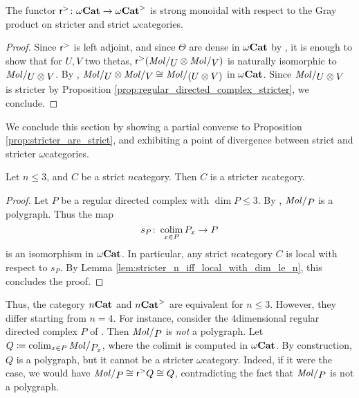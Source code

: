 \begin{prop} \label{prop:reflection_to_stricter_monoidal}
    The functor \( \mathsf{r}^{>} \colon {\omega\mathbf{Cat}} \to {\omega\mathbf{Cat}}^> \) is strong monoidal with respect to the Gray product on stricter and strict \( \omega \)\nbd categories.
\end{prop}
\begin{proof}
    Since \( \mathsf{r}^{>} \) is left adjoint, and since \( \Theta \) are dense in \( {\omega\mathbf{Cat}} \) by \cite[Proposition 4.6]{ara2020joint}, it is enough to show that for \( U, V \) two thetas, \( \rcs (\molecin{U} \gray \molecin{V}) \) is naturally isomorphic to \( \molecin{U \gray V} \).
    By \cite[Lemma 9.1.16, Proposition 11.2.36]{hadzihasanovic2024combinatorics}, \( \molecin{U} \gray \molecin{V} \cong \molecin{(U \gray V)} \) in \( {\omega\mathbf{Cat}} \).
    Since \( \molecin{U \gray V} \) is stricter by Proposition \ref{prop:regular_directed_complex_stricter}, we conclude.
\end{proof}

\noindent We conclude this section by showing a partial converse to Proposition \ref{prop:stricter_are_strict}, and exhibiting a point of divergence between strict and stricter \( \omega \)\nbd categories.

\begin{thm}\label{thm:strict_le_3_are_stricter}
    Let \( n \le 3 \), and \( C \) be a strict \( n \)\nbd category.
    Then \( C \) is a stricter \( n \)\nbd category.
\end{thm}
\begin{proof}
    Let \( P \) be a regular directed complex with \( \dim P \le 3 \).
    By \cite[Corollary 8.4.12]{hadzihasanovic2024combinatorics}, \( \molecin{P} \) is a polygraph.
    Thus the map
    \begin{equation*}
        s_P \colon \operatorname*{colim}_{x \in P} {P}_{x} \to P 
    \end{equation*}
    is an isomorphism in \( {\omega\mathbf{Cat}} \).
    In particular, any strict \( n \)\nbd category \( C \) is local with respect to \( s_P \).
    By Lemma \ref{lem:stricter_n_iff_local_with_dim_le_n}, this concludes the proof.
\end{proof}

\begin{comm} \label{comm:strict_are_not_stricter}
    Thus, the category \( {n\mathbf{Cat}} \) and \( {n\mathbf{Cat}}^> \) are equivalent for \( n \le 3 \).
    However, they differ starting from \( n = 4 \).
    For instance, consider the \( 4 \)\nbd dimensional regular directed complex \( P \) of \cite[Example 8.2.20]{hadzihasanovic2024combinatorics}.
    Then \( \molecin{P} \) is \emph{not} a polygraph.
    Let \( Q \eqdef \colim_{x \in P} \molecin{\imel{P}{x}} \), where the colimit is computed in \( {\omega\mathbf{Cat}} \).
    By construction, \( Q \) is a polygraph, but it cannot be a stricter \( \omega \)\nbd category.
    Indeed, if it were the case, we would have \( \molecin{P} \cong \rcs Q \cong Q \), contradicting the fact that \( \molecin{P} \) is not a polygraph.
\end{comm}

